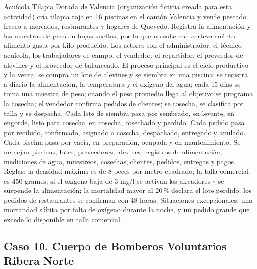 \documentclass[11pt]{article}
\newcommand{\subseccion}[1]{\subsection{\textcolor{midblue}{#1}}}
\begin{document}
Acuícola Tilapia Dorada de Valencia (organización ficticia creada para esta actividad) cría tilapia roja en 16 piscinas en el cantón Valencia y vende pescado fresco a mercados, restaurantes y hogares de Quevedo. Registra la alimentación y las muestras de peso en hojas sueltas, por lo que no sabe con certeza cuánto alimento gasta por kilo producido. Los actores son el administrador, el técnico acuícola, los trabajadores de campo, el vendedor, el repartidor, el proveedor de alevines y el proveedor de balanceado. El proceso principal es el ciclo productivo y la venta: se compra un lote de alevines y se siembra en una piscina; se registra a diario la alimentación, la temperatura y el oxígeno del agua; cada 15 días se toma una muestra de peso; cuando el peso promedio llega al objetivo se programa la cosecha; el vendedor confirma pedidos de clientes; se cosecha, se clasifica por talla y se despacha. Cada lote de siembra pasa por sembrado, en levante, en engorde, listo para cosecha, en cosecha, cosechado y perdido. Cada pedido pasa por recibido, confirmado, asignado a cosecha, despachado, entregado y anulado. Cada piscina pasa por vacía, en preparación, ocupada y en mantenimiento. Se manejan piscinas, lotes, proveedores, alevines, registros de alimentación, mediciones de agua, muestreos, cosechas, clientes, pedidos, entregas y pagos. Reglas: la densidad máxima es de 8 peces por metro cuadrado; la talla comercial es 450 gramos; si el oxígeno baja de 3 mg/l se activan los aireadores y se suspende la alimentación; la mortalidad mayor al 20\,\% declara el lote perdido; los pedidos de restaurantes se confirman con 48 horas. Situaciones excepcionales: una mortandad súbita por falta de oxígeno durante la noche, y un pedido grande que excede lo disponible en talla comercial.

\subseccion{Caso 10. Cuerpo de Bomberos Voluntarios Ribera Norte}
\end{document}

